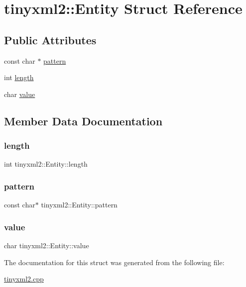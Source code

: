 \hypertarget{structtinyxml2_1_1_entity}{}\section{tinyxml2\+:\+:Entity Struct Reference}
\label{structtinyxml2_1_1_entity}
\subsection*{Public Attributes}
\begin{DoxyCompactItemize}
\item 
const char $\ast$ \hyperlink{structtinyxml2_1_1_entity_ab330f5d665d29bfc811ecfa76315894b}{pattern}
\item 
int \hyperlink{structtinyxml2_1_1_entity_a25e2b57cb59cb4fa68f283d7cb570f21}{length}
\item 
char \hyperlink{structtinyxml2_1_1_entity_a7334e81e33b4615655a403711b24f3ed}{value}
\end{DoxyCompactItemize}


\subsection{Member Data Documentation}
\mbox{\label{structtinyxml2_1_1_entity_a25e2b57cb59cb4fa68f283d7cb570f21}} 
\subsubsection{\texorpdfstring{length}{length}}
{\footnotesize\ttfamily int tinyxml2\+::\+Entity\+::length}

\mbox{\label{structtinyxml2_1_1_entity_ab330f5d665d29bfc811ecfa76315894b}} 
\subsubsection{\texorpdfstring{pattern}{pattern}}
{\footnotesize\ttfamily const char$\ast$ tinyxml2\+::\+Entity\+::pattern}

\mbox{\label{structtinyxml2_1_1_entity_a7334e81e33b4615655a403711b24f3ed}} 
\subsubsection{\texorpdfstring{value}{value}}
{\footnotesize\ttfamily char tinyxml2\+::\+Entity\+::value}



The documentation for this struct was generated from the following file\+:\begin{DoxyCompactItemize}
\item 
\hyperlink{tinyxml2_8cpp}{tinyxml2.\+cpp}\end{DoxyCompactItemize}
